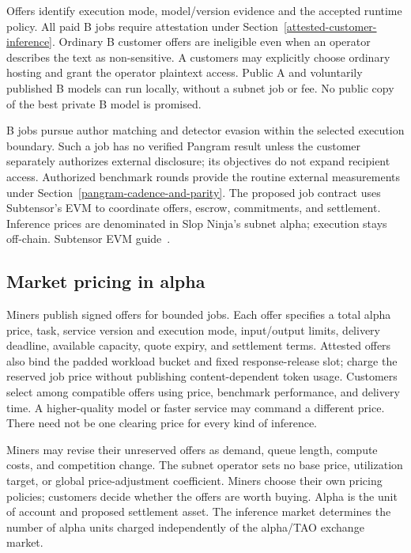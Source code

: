 Offers identify execution mode, model/version evidence and the accepted
runtime policy. All paid B jobs require attestation under
Section~\ref{attested-customer-inference}. Ordinary B customer offers are
ineligible even when an operator describes the text as non-sensitive.
A customers may explicitly choose ordinary hosting and grant the operator
plaintext access. Public A
and voluntarily published B models can run locally, without a subnet
job or fee. No public copy of the best private B model is promised.

B jobs pursue author matching and detector evasion within the selected
execution boundary. Such a job has no verified Pangram result
unless the customer separately authorizes external disclosure; its
objectives do not expand recipient access. Authorized benchmark rounds
provide the routine external measurements under
Section~\ref{pangram-cadence-and-parity}.
The proposed job contract uses Subtensor's EVM to coordinate offers,
escrow, commitments, and settlement. Inference prices are denominated in
Slop Ninja's subnet alpha; execution stays off-chain.
Subtensor EVM guide~\cite{evm}.

\subsection{Market pricing in alpha}\label{market-pricing-in-alpha}

Miners publish signed offers for bounded jobs. Each offer specifies a
total alpha price, task, service version and execution mode, input/output limits,
delivery deadline, available capacity, quote expiry, and settlement
terms. Attested offers also bind the padded workload bucket
and fixed response-release slot; charge the reserved job price without
publishing content-dependent token usage. Customers select among compatible offers using price, benchmark
performance, and delivery time. A higher-quality model or faster service
may command a different price. There need not be one clearing price for
every kind of inference.

Miners may revise their unreserved offers as demand, queue length,
compute costs, and competition change. The subnet operator sets no base
price, utilization target, or global price-adjustment coefficient.
Miners choose their own pricing policies; customers decide whether the
offers are worth buying. Alpha is the unit of account and proposed
settlement asset. The inference market determines the number of alpha
units charged independently of the alpha/TAO exchange market.

